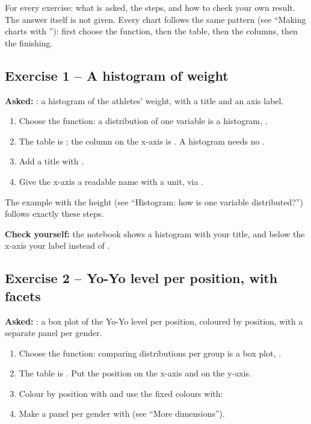 \documentclass[11pt,a4paper]{article}
\begin{document}
For every exercise: what is asked, the steps, and how to check your own
result. The answer itself is not given. Every chart follows the same
pattern (see ``Making charts with ''): first choose
the function, then the table, then the columns, then the finishing.

\subsection*{Exercise 1 -- A histogram of weight}

\textbf{Asked:} : a histogram of the athletes'
weight, with a title and an axis label.

\begin{enumerate}
  \item Choose the function: a distribution of one variable is a
        histogram, .
  \item The table is ; the column on the x-axis is
        . A histogram needs no .
  \item Add a title with .
  \item Give the x-axis a readable name with a unit, via
        .
\end{enumerate}

The example with the height (see ``Histogram: how is one variable
distributed?'') follows exactly these steps.

\textbf{Check yourself:} the notebook shows a histogram with your title,
and below the x-axis your label instead of .

\subsection*{Exercise 2 -- Yo-Yo level per position, with facets}

\textbf{Asked:} : a box plot of the Yo-Yo level per
position, coloured by position, with a separate panel per gender.

\begin{enumerate}
  \item Choose the function: comparing distributions per group is a box
        plot, .
  \item The table is . Put the position on the x-axis and
         on the y-axis.
  \item Colour by position with  and use the fixed
        colours with:\newline {}
  \item Make a panel per gender with  (see ``More
        dimensions'').
\end{enumerate}
\end{document}
